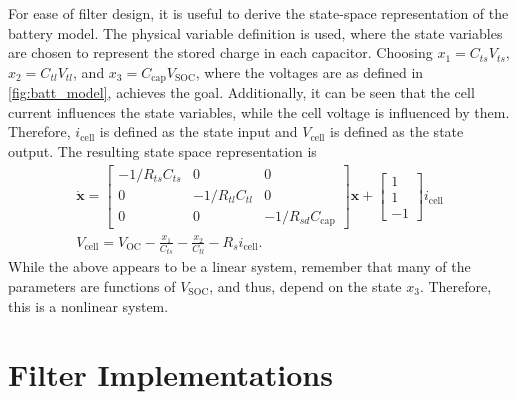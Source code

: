 \documentclass[../zhang_thesis.tex]{subfiles}
\begin{document}
For ease of filter design, it is useful to derive the state-space representation of the battery model. The physical variable definition is used, where the state variables are chosen to represent the stored charge in each capacitor. Choosing $x_1=C_{ts}V_{ts}$, $x_2=C_{tl}V_{tl}$, and $x_3=C_\text{cap}V_\text{SOC}$, where the voltages are as defined in \autoref{fig:batt_model}, achieves the goal. Additionally, it can be seen that the cell current influences the state variables, while the
cell voltage is influenced by them. Therefore, $i_\text{cell}$ is defined as the state input and $V_\text{cell}$ is defined as the state output. The resulting state space representation is
\begin{gather}
    \dot{\mathbf{x}} = \begin{bmatrix}
        -1/R_{ts}C_{ts} & 0 & 0 \\
        0 & -1/R_{tl}C_{tl} & 0 \\
        0 & 0 & -1/R_{sd}C_\text{cap}
    \end{bmatrix} \mathbf{x} + \begin{bmatrix} 1 \\ 1 \\ -1 \end{bmatrix} i_\text{cell} \\
    V_\text{cell} = V_\text{OC} - \frac{x_1}{C_{ts}} - \frac{x_2}{C_{tl}} - R_s i_\text{cell}.
\end{gather}
While the above appears to be a linear system, remember that many of the parameters are functions of $V_\text{SOC}$, and thus, depend on the state $x_3$. Therefore, this is a nonlinear system.


\section{Filter Implementations}

\end{document}
